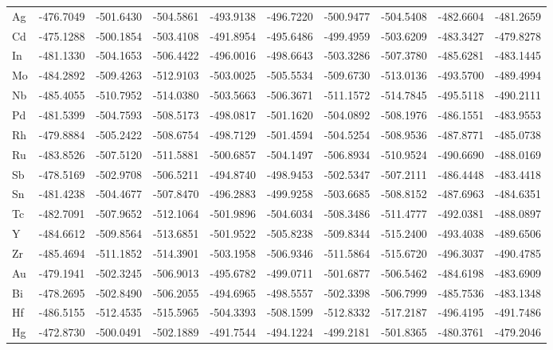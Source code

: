 \documentclass[a4paper, 12pt]{article}
\begin{document}
\begin{table}[htbp]
{\begin{tabular}{l *{9}{l}}
      Ag & -476.7049 & -501.6430 & -504.5861 & -493.9138 & -496.7220 & -500.9477 & -504.5408 & -482.6604 & -481.2659 \\
      Cd & -475.1288 & -500.1854 & -503.4108 & -491.8954 & -495.6486 & -499.4959 & -503.6209 & -483.3427 & -479.8278 \\
      In & -481.1330 & -504.1653 & -506.4422 & -496.0016 & -498.6643 & -503.3286 & -507.3780 & -485.6281 & -483.1445 \\
      Mo & -484.2892 & -509.4263 & -512.9103 & -503.0025 & -505.5534 & -509.6730 & -513.0136 & -493.5700 & -489.4994 \\
      Nb & -485.4055 & -510.7952 & -514.0380 & -503.5663 & -506.3671 & -511.1572 & -514.7845 & -495.5118 & -490.2111 \\
      Pd & -481.5399 & -504.7593 & -508.5173 & -498.0817 & -501.1620 & -504.0892 & -508.1976 & -486.1551 & -483.9553 \\
      Rh & -479.8884 & -505.2422 & -508.6754 & -498.7129 & -501.4594 & -504.5254 & -508.9536 & -487.8771 & -485.0738 \\
      Ru & -483.8526 & -507.5120 & -511.5881 & -500.6857 & -504.1497 & -506.8934 & -510.9524 & -490.6690 & -488.0169 \\
      Sb & -478.5169 & -502.9708 & -506.5211 & -494.8740 & -498.9453 & -502.5347 & -507.2111 & -486.4448 & -483.4418 \\
      Sn & -481.4238 & -504.4677 & -507.8470 & -496.2883 & -499.9258 & -503.6685 & -508.8152 & -487.6963 & -484.6351 \\
      Tc & -482.7091 & -507.9652 & -512.1064 & -501.9896 & -504.6034 & -508.3486 & -511.4777 & -492.0381 & -488.0897 \\
      Y  & -484.6612 & -509.8564 & -513.6851 & -501.9522 & -505.8238 & -509.8344 & -515.2400 & -493.4038 & -489.6506 \\
      Zr & -485.4694 & -511.1852 & -514.3901 & -503.1958 & -506.9346 & -511.5864 & -515.6720 & -496.3037 & -490.4785 \\
      Au & -479.1941 & -502.3245 & -506.9013 & -495.6782 & -499.0711 & -501.6877 & -506.5462 & -484.6198 & -483.6909 \\
      Bi & -478.2695 & -502.8490 & -506.2055 & -494.6965 & -498.5557 & -502.3398 & -506.7999 & -485.7536 & -483.1348 \\
      Hf & -486.5155 & -512.4535 & -515.5965 & -504.3393 & -508.1599 & -512.8332 & -517.2187 & -496.4195 & -491.7486 \\
      Hg & -472.8730 & -500.0491 & -502.1889 & -491.7544 & -494.1224 & -499.2181 & -501.8365 & -480.3761 & -479.2046 \\

\end{tabular}}
\end{table}
\end{document}
